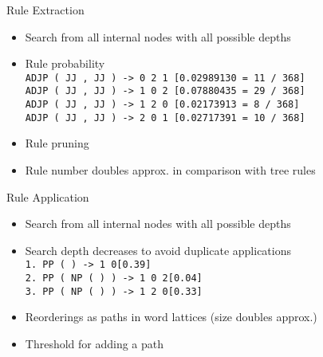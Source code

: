 \documentclass[18pt]{beamer}
\newcommand{\ul}[1]{{\color{red}{#1}}}
\begin{document}
\begin{frame}{Rule Extraction}
\begin{itemize}[<+-| alert@+>]
\item Search from all internal nodes with all possible depths
\item Rule probability
\bigskip \\
\texttt{ADJP ( JJ , JJ ) -> 0 2 1 \hphantom{xx}  [0.02989130 = \hphantom{x}11 / 368]}\\
\texttt{ADJP ( JJ , JJ ) -> 1 0 2 \hphantom{xx}  [0.07880435 =  \hphantom{x}29 / 368]}\\
\texttt{ADJP ( JJ , JJ ) -> 1 2 0 \hphantom{xx}  [0.02173913 =  \hphantom{xx}8 / 368]}\\
\texttt{ADJP ( JJ , JJ ) -> 2 0 1 \hphantom{xx}  [0.02717391 =  \hphantom{x}10 / 368]} \bigskip \\
\item Rule pruning
\item Rule number doubles approx. in comparison with tree rules
\end{itemize}
\end{frame}

\begin{frame}{Rule Application}
\begin{itemize}[<+-| alert@+>]
\item Search from all internal nodes with all possible depths
\item Search depth decreases to avoid duplicate applications \bigskip \\
\texttt{1. PP ( \ul{IN$_0$} \ul{NP$_1$} ) -> 1 0\hspace{10em}[0.39]}\\
\texttt{2. PP ( \ul{IN$_0$} NP ( \ul{JJ$_1$} \ul{NNS$_2$} ) ) -> 1 0 2\hspace{3em}\hspace{1pt}[0.04]} \\
\texttt{3. PP ( \ul{IN$_0$} NP ( \ul{JJ$_1$} \ul{NNS$_2$} ) ) -> 1 2 0\hspace{3em}\hspace{1pt}[0.33]} \bigskip \\
\item Reorderings as paths in word lattices (size doubles approx.)
\item Threshold for adding a path
\end{itemize}
\end{frame}
\end{document}
